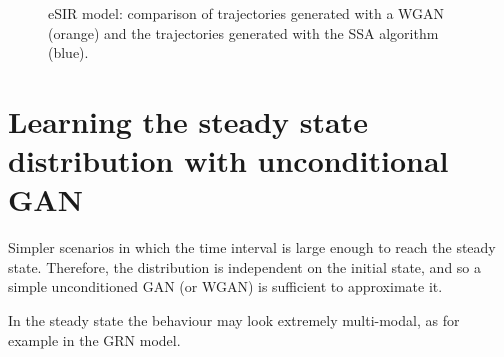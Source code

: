 \documentclass{article}
\begin{document}
\begin{figure}[hb]
    \caption{eSIR model: comparison of trajectories generated with a WGAN (orange) and the trajectories generated with the SSA algorithm (blue).}
    \label{fig:ts_trajectories}
\end{figure} 

   
    
\section{Learning the steady state distribution with unconditional GAN}

Simpler scenarios in which the time interval is large enough to reach the steady state. Therefore, the distribution is independent on the initial state, and so a simple unconditioned GAN (or WGAN) is sufficient to approximate it.

In the steady state the behaviour may look extremely multi-modal, as for example in the GRN model.
\end{document}
